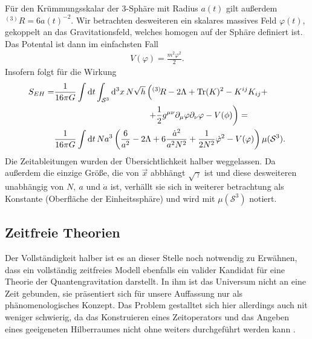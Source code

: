 \documentclass{scrartcl}
\newcommand{\inHS}{{}^{(3)}\!}
\newcommand{\VSthree}{\mu(\mathcal{S}^3)}
\begin{document}
			Für den Krümmungsskalar der 3-Sphäre mit Radius $a(t)$ gilt außerdem $\inHS R=6 a(t)^{-2}$.
			Wir betrachten desweiteren ein skalares massives Feld $\varphi(t)$, gekoppelt an das Gravitationsfeld,
			welches homogen auf der Sphäre definiert ist. Das Potental ist dann im einfachsten Fall
			\begin{align}
				V(\varphi)=\frac{m^2 \varphi^2}{2}.
			\end{align}
			Insofern folgt für die Wirkung
			\begin{align}
				S_{EH}=&\frac{1}{16\pi G}\int{\rm d}t\int_{\mathcal{S}^3}{\rm d}^3 x\, N\sqrt{h}\left(\inHS R-2\Lambda+{\rm Tr}(K)^2-K^{ij}K_{ij}+\right.\notag\\
						&\qquad\qquad\qquad\quad\qquad\qquad\left.+\frac{1}{2}g^{\mu\nu}\partial_\mu \varphi\partial_\nu \varphi-V(\phi)\right)=\notag\\
					&\frac{1}{16\pi G}\int{\rm d}t\, N a^3\left(\frac{6}{a^2}-2\Lambda+6\frac{\dot{a}^2}{a^2N^2}+\frac{1}{2 N^2}\dot{\varphi}^2-V(\varphi)\right) \VSthree.
			\end{align}
			Die Zeitableitungen wurden der Übersichtlichkeit halber weggelassen. Da außerdem die einzige Größe, die von $\vec{x}$ abbhängt $\sqrt{\gamma}$ ist
			und diese desweiteren unabhängig von $N,\ a$ und $\dot{a}$ ist, verhällt sie sich in weiterer betrachtung als Konstante (Oberfläche der Einheitssphäre) und
			wird mit $\VSthree$ notiert.
		\subsection{Zeitfreie Theorien}
			Der Vollständigkeit halber ist es an dieser Stelle noch notwendig zu Erwähnen,
			dass ein vollständig zeitfreies Modell ebenfalls ein valider Kandidat für eine Theorie der Quantengravitation darstellt. In ihm ist das Universum
			nicht an eine Zeit gebunden, sie präsentiert sich für unsere Auffassung nur als phänomenologisches 
			Konzept. Das Problem gestalltet sich hier allerdings auch nit weniger schwierig,
			da das Konstruieren eines Zeitoperators und das Angeben eines geeigeneten Hilberraumes nicht
			ohne weiters durchgeführt werden kann \cite{qg06}.
	{}
	
\end{document}
